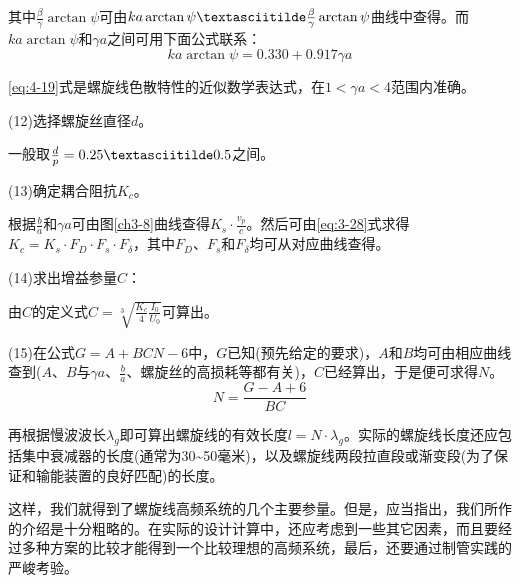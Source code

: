 其中$ \frac{\beta}{\gamma}\arctan\psi $可由$ ka\arctan\psi \textasciitilde  \frac{\beta}{\gamma}\arctan\psi $曲线中查得。而$ ka\arctan\psi $和$ \gamma a $之间可用下面公式联系：
\begin{equation} \label{eq:4-19}
	ka\arctan\psi = 0.330+0.917\gamma a
\end{equation}

\eqref{eq:4-19}式是螺旋线色散特性的近似数学表达式，在$ 1 < \gamma a < 4 $范围内准确。

(12)选择螺旋丝直径$ d $。

一般取$ \frac{d}{p} = 0.25\textasciitilde0.5 $之间。

(13)确定耦合阻抗$ K_c $。

根据$ \frac{b}{a} $和$ \gamma a $可由图\ref{ch3-8}曲线查得$ K_s\cdot\frac{v_p}{c} $。然后可由\ref{eq:3-28}式求得$ K_c = K_s\cdot F_D\cdot F_s \cdot F_\delta $，其中$ F_D $、$ F_s $和$ F_\delta $均可从对应曲线查得。

(14)求出增益参量$ C $：

由$ C $的定义式$ C = \sqrt[3]{\frac{K_c}{4} \frac{I_0}{U_0}} $可算出。

(15)在公式$ G = A +\mathit{BCN}-6 $中，$ G $已知(预先给定的要求)，$ A $和$ B $均可由相应曲线查到($ A $、$ B $与$ \gamma a $、$ \frac{b}{a} $、螺旋丝的高损耗等都有关)，$ C $已经算出，于是便可求得$ N $。
\[ N = \frac{G - A +6}{BC} \]

再根据慢波波长$ \lambda_g $即可算出螺旋线的有效长度$ l = N\cdot \lambda_g $。实际的螺旋线长度还应包括集中衰减器的长度(通常为30\textasciitilde50毫米)，以及螺旋线两段拉直段或渐变段(为了保证和输能装置的良好匹配)的长度。

这样，我们就得到了螺旋线高频系统的几个主要参量。但是，应当指出，我们所作的介绍是十分粗略的。在实际的设计计算中，还应考虑到一些其它因素，而且要经过多种方案的比较才能得到一个比较理想的高频系统，最后，还要通过制管实践的严峻考验。











